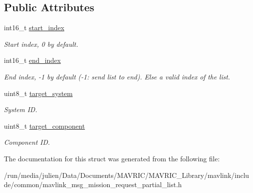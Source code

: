 \subsection*{Public Attributes}
\begin{DoxyCompactItemize}
\item 
\hypertarget{struct____mavlink__mission__request__partial__list__t_aa88d56cd8a892b8416b49a6e0ec9b5cf}{int16\+\_\+t \hyperlink{struct____mavlink__mission__request__partial__list__t_aa88d56cd8a892b8416b49a6e0ec9b5cf}{start\+\_\+index}}\label{struct____mavlink__mission__request__partial__list__t_aa88d56cd8a892b8416b49a6e0ec9b5cf}

\begin{DoxyCompactList}\small\item\em Start index, 0 by default. \end{DoxyCompactList}\item 
\hypertarget{struct____mavlink__mission__request__partial__list__t_a9e484b80b2b8a0ced10f414e2d6c2636}{int16\+\_\+t \hyperlink{struct____mavlink__mission__request__partial__list__t_a9e484b80b2b8a0ced10f414e2d6c2636}{end\+\_\+index}}\label{struct____mavlink__mission__request__partial__list__t_a9e484b80b2b8a0ced10f414e2d6c2636}

\begin{DoxyCompactList}\small\item\em End index, -\/1 by default (-\/1\+: send list to end). Else a valid index of the list. \end{DoxyCompactList}\item 
\hypertarget{struct____mavlink__mission__request__partial__list__t_aa4ec7ce5b44a621b414861aa5e575cc6}{uint8\+\_\+t \hyperlink{struct____mavlink__mission__request__partial__list__t_aa4ec7ce5b44a621b414861aa5e575cc6}{target\+\_\+system}}\label{struct____mavlink__mission__request__partial__list__t_aa4ec7ce5b44a621b414861aa5e575cc6}

\begin{DoxyCompactList}\small\item\em System I\+D. \end{DoxyCompactList}\item 
\hypertarget{struct____mavlink__mission__request__partial__list__t_abc11feeb766eb42c7eadff5850284cd2}{uint8\+\_\+t \hyperlink{struct____mavlink__mission__request__partial__list__t_abc11feeb766eb42c7eadff5850284cd2}{target\+\_\+component}}\label{struct____mavlink__mission__request__partial__list__t_abc11feeb766eb42c7eadff5850284cd2}

\begin{DoxyCompactList}\small\item\em Component I\+D. \end{DoxyCompactList}\end{DoxyCompactItemize}


The documentation for this struct was generated from the following file\+:\begin{DoxyCompactItemize}
\item 
/run/media/julien/\+Data/\+Documents/\+M\+A\+V\+R\+I\+C/\+M\+A\+V\+R\+I\+C\+\_\+\+Library/mavlink/include/common/mavlink\+\_\+msg\+\_\+mission\+\_\+request\+\_\+partial\+\_\+list.\+h\end{DoxyCompactItemize}
